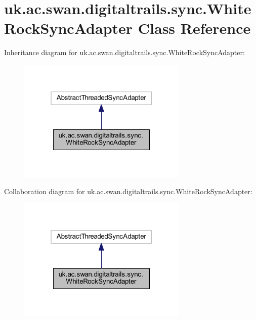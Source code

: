 \hypertarget{classuk_1_1ac_1_1swan_1_1digitaltrails_1_1sync_1_1_white_rock_sync_adapter}{\section{uk.\+ac.\+swan.\+digitaltrails.\+sync.\+White\+Rock\+Sync\+Adapter Class Reference}
\label{classuk_1_1ac_1_1swan_1_1digitaltrails_1_1sync_1_1_white_rock_sync_adapter}
}


Inheritance diagram for uk.\+ac.\+swan.\+digitaltrails.\+sync.\+White\+Rock\+Sync\+Adapter\+:\nopagebreak
\begin{figure}[H]
\begin{center}
\leavevmode
\includegraphics[width=229pt]{classuk_1_1ac_1_1swan_1_1digitaltrails_1_1sync_1_1_white_rock_sync_adapter__inherit__graph}
\end{center}
\end{figure}


Collaboration diagram for uk.\+ac.\+swan.\+digitaltrails.\+sync.\+White\+Rock\+Sync\+Adapter\+:\nopagebreak
\begin{figure}[H]
\begin{center}
\leavevmode
\includegraphics[width=229pt]{classuk_1_1ac_1_1swan_1_1digitaltrails_1_1sync_1_1_white_rock_sync_adapter__coll__graph}
\end{center}
\end{figure}
